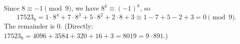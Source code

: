 Since $8\equiv-1\pmod9$, we have $8^k\equiv(-1)^k$, so
\[
17523_8=1\cdot8^4+7\cdot8^3+5\cdot8^2+2\cdot8+3\equiv1-7+5-2+3=0\pmod9 .
\]
The remainder is $\boxed{0}$. (Directly: $17523_8=4096+3584+320+16+3=8019=9\cdot891$.)
